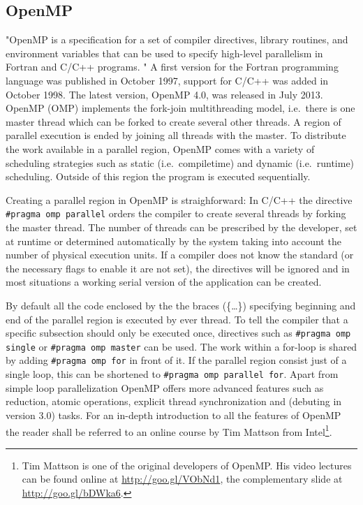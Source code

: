 \subsection{OpenMP}
"OpenMP is a specification for a set of compiler directives, library routines, and environment variables that can be used to specify high-level parallelism in Fortran and C/C++ programs. \cite{openmp_architecture_review_board_frequently_2014}" A first version for the Fortran programming language was published in October 1997, support for C/C++ was added in October 1998. The latest version, OpenMP 4.0, was released in July 2013. OpenMP (OMP) implements the fork-join multithreading model, i.e.\ there is one master thread which can be forked to create several other threads. A region of parallel execution is ended by joining all threads with the master. To distribute the work available in a parallel region, OpenMP comes with a variety of scheduling strategies such as static (i.e.\ compiletime) and dynamic (i.e.\ runtime) scheduling. Outside of this region the program is executed sequentially. 

Creating a parallel region in OpenMP is straighforward: In C/C++ the directive \texttt{\#pragma omp parallel} orders the compiler to create several threads by forking the master thread. The number of threads can be prescribed by the developer, set at runtime or determined automatically by the system taking into account the number of physical execution units. If a compiler does not know the standard (or the necessary flags to enable it are not set), the directives will be ignored and in most situations a working serial version of the application can be created. 

By default all the code enclosed by the the braces (\{\ldots\}) specifying beginning and end of the parallel region is executed by ever thread. To tell the compiler that a specific subsection should only be executed once, directives such as \texttt{\#pragma omp single} or \texttt{\#pragma omp master} can be used. The work within a for-loop is shared by adding \texttt{\#pragma omp for} in front of it. If the parallel region consist just of a single loop, this can be shortened to \texttt{\#pragma omp parallel for}. Apart from simple loop parallelization OpenMP offers more advanced features such as reduction, atomic operations, explicit thread synchronization and (debuting in version 3.0) tasks. For an in-depth introduction to all the features of OpenMP the reader shall be referred to an online course by Tim Mattson from Intel\footnote{Tim Mattson is one of the original developers of OpenMP. His video lectures can be found online at \url{http://goo.gl/VObNd1}, the complementary slide at \url{http://goo.gl/bDWka6}.}. 

